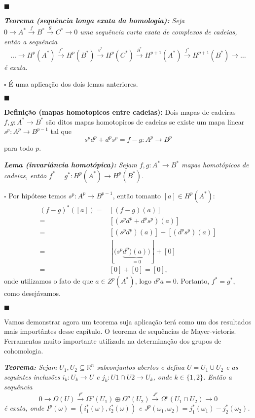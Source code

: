 \documentclass{article}
\begin{document}
	$\blacksquare$
	
	\vspace{2mm}
	\textit{\textbf{Teorema (sequência longa exata da homologia):} Seja $0 \to A^{*} \xrightarrow{f} B^{*} \xrightarrow{g} C^{*} \to 0$ uma sequência curta exata de complexos de cadeias, então a sequência
		$$
		\dots \to H^{p}(A^{*}) \xrightarrow{f^{*}} H^{p}(B^{*}) \xrightarrow{g^{*}} H^{p}(C^{*}) \xrightarrow{\partial^{*}} H^{p+1}(A^{*}) \xrightarrow{f^{*}} H^{p+1}(B^{*}) \to \dots
		$$
		é exata.}
	
	$\square$ É uma aplicação dos dois lemas anteriores. 
	
	$\blacksquare$
	
	\vspace{2mm}
	\textbf{Definição (mapas homotopicos entre cadeias):} Dois mapas de cadeiras $f,g : A^{*} \to B^{*}$ são ditos mapas homotopicos de cadeias se existe um mapa linear $s^{p}: A^{p} \to B^{p-1}$ tal que
	$$
	s^{p}d^{p} + d^{p}s^{p} = f-g : A^{p} \to B^{p}
	$$
	para todo $p$.
	
	\vspace{2mm}
	\textit{\textbf{Lema (invariância homotópica):} Sejam $f,g : A^{*} \to B^{*}$ mapas homotópicos de cadeias, então $f^{*} = g^{*}: H^{p}(A^{*}) \to H^{p}(B^{*})$.}
	
	$\square$ Por hipótese temos $s^{p}: A^{p} \to B^{p-1}$, então tomanto $[a] \in H^{p}(A^{*})$:
	$$
	\begin{aligned}
	(f-g)^{*}([a]) =& [(f-g)(a)]
	\\
	=& [(s^{p}d^{p} + d^{p}s^{p})(a)]
	\\
	=& [(s^{p}d^{p})(a)] + [(d^{p}s^{p})(a)]
	\\
	=& [(s^{p} \underbrace{d^{p})(a))}_{
		=0}] +[0]
	\\
	=& [0]+[0] = [0],
	\end{aligned}
	$$ 
	onde utilizamos o fato de que $a\in Z^{p}(A^{*})$, logo $d^{p}a = 0$. Portanto, $f^{*} = g^{*}$, como desejávamos. 
	
	$\blacksquare$
	
	Vamos demonstrar agora um teorema suja aplicação terá como um dos resultados mais importântes desse capítulo. O teorema de sequências de Mayer-vietoris. Ferramentas muito importante utilizada na determinação dos grupos de cohomologia.
	
	\vspace{2mm}
	\textit{\textbf{Teorema:} Sejam $U_{1}, U_{2} \subseteq \mathbb{R}^{n}$ subconjuntos abertos e defina $U=U_{1} \cup U_{2}$ e as seguintes inclusões $i_{k}: U_{k} \to U$ e $j_{k}: U{1}\cap U{2} \to U_{k}$, onde $k \in \{1,2\}$. Então a sequência
		$$
		0 \to \Omega(U) \xrightarrow{I^{p}} \Omega^{p}(U_{1}) \oplus \Omega^{p}(U_{2}) \xrightarrow{J^{p}} \Omega^{p}(U_{1} \cap U_{2}) \to 0 
		$$
		é exata, onde $I^{p}(\omega) = (i^{*}_{1}(\omega), i^{*}_{2}(\omega))$ e $J^{p}(\omega_{1}, \omega_{2}) = j^{*}_{1}(\omega_{1})- j^{*}_{2}(\omega_{2})$.}
	
\end{document}
